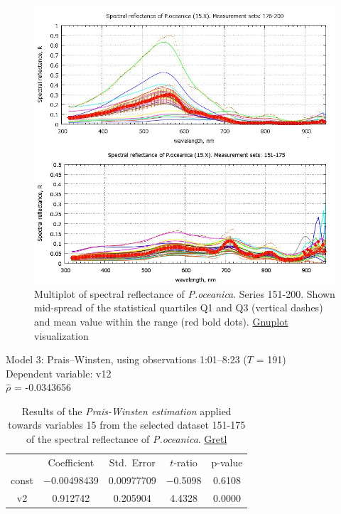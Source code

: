 \documentclass[10pt, a4paper]{article}
\begin{document}
\begin{appendices}
\begin{figure}[H]
	\begin{center}
		\includegraphics[scale=0.38]{GNU-15.jpg}
		\caption{Multiplot of spectral reflectance of \textit{P.oceanica}. Series 151-200. Shown mid-spread of the statistical quartiles Q1 and Q3 (vertical dashes) and mean value within the range (red bold dots). \href{http://www.gnuplot.info/}{Gnuplot} visualization­}
		\label{fig:A.28}
	\end{center}
\end{figure}
\pagebreak

\begin{table}[H]
	\begin{center}
	\caption{Results of the \textit{Prais-Winsten estimation} applied towards variables 15 from the selected dataset 151-175 of the spectral reflectance of \textit{P.oceanica}. \href{http://gretl.sourceforge.net/}{Gretl}}
	\label{tab:26}
		Model 3: Prais--Winsten, using observations 1:01--8:23 ($T$ = 191)\\
		Dependent variable: v12\\
	$\hat{\rho}$ = -0.0343656

	\vspace{1em}

	\begin{tabular}{|c c c c c|}
		  & {Coefficient} &  {Std.\ Error} & {$t$-ratio} &   {p-value} \\[1ex]
		const &   $-$0.00498439 &     0.00977709 &       $-$0.5098 &         0.6108 \\
		v2 &   0.912742 &     0.205904 &      4.4328 &         0.0000 \\
	\end{tabular}


\end{center}
\end{table}
\end{appendices}
\end{document}
